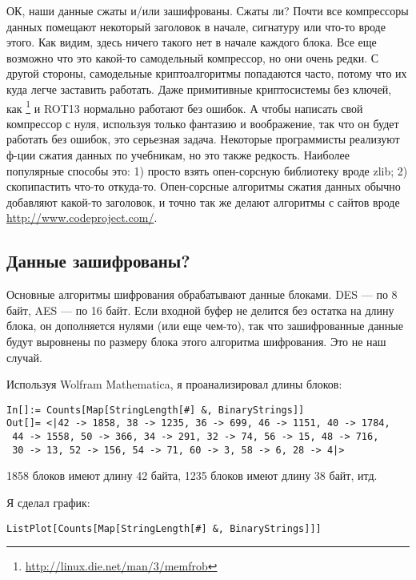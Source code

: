 ОК, наши данные сжаты и/или зашифрованы.
Сжаты ли? Почти все компрессоры данных помещают некоторый заголовок в начале, сигнатуру или что-то вроде этого.
Как видим, здесь ничего такого нет в начале каждого блока.
Все еще возможно что это какой-то самодельный компрессор, но они очень редки.
С другой стороны, самодельные криптоалгоритмы попадаются часто, потому что их куда легче заставить работать.
Даже примитивные криптосистемы без ключей, как \footnote{\url{http://linux.die.net/man/3/memfrob}}
и ROT13 нормально работают без ошибок.
А чтобы написать свой компрессор с нуля, используя только фантазию и воображение, так что он будет работать без ошибок,
это серьезная задача.
Некоторые программисты реализуют ф-ции сжатия данных по учебникам, но это также редкость.
Наиболее популярные способы это:
1) просто взять опен-сорсную библиотеку вроде zlib;
2) скопипастить что-то откуда-то.
Опен-сорсные алгоритмы сжатия данных обычно добавляют какой-то заголовок, и точно так же делают алгоритмы с сайтов вроде
\url{http://www.codeproject.com/}.

\subsection{Данные зашифрованы?}

Основные алгоритмы шифрования обрабатывают данные блоками. DES --- по 8 байт, AES --- по 16 байт.
Если входной буфер не делится без остатка на длину блока, он дополняется нулями (или еще чем-то), так что зашифрованные
данные будут выровнены по размеру блока этого алгоритма шифрования.
Это не наш случай.

Используя Wolfram Mathematica, я проанализировал длины блоков:

\begin{lstlisting}
In[]:= Counts[Map[StringLength[#] &, BinaryStrings]]
Out[]= <|42 -> 1858, 38 -> 1235, 36 -> 699, 46 -> 1151, 40 -> 1784, 
 44 -> 1558, 50 -> 366, 34 -> 291, 32 -> 74, 56 -> 15, 48 -> 716, 
 30 -> 13, 52 -> 156, 54 -> 71, 60 -> 3, 58 -> 6, 28 -> 4|>
\end{lstlisting}

1858 блоков имеют длину 42 байта, 1235 блоков имеют длину 38 байт, итд.

Я сделал график:

\begin{lstlisting}
ListPlot[Counts[Map[StringLength[#] &, BinaryStrings]]]
\end{lstlisting}

